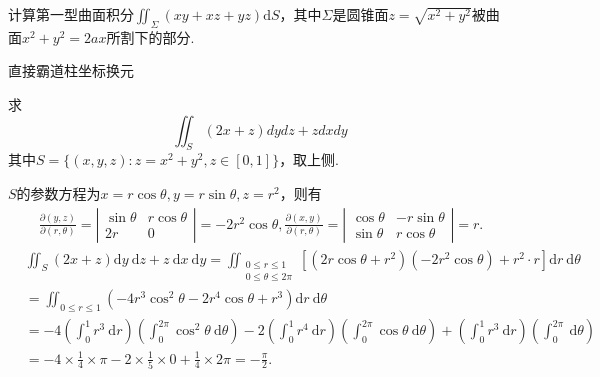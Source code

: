 \begin{exercise}
    计算第一型曲面积分$\iint_\Sigma(xy+xz+yz)\mathrm{d}S$，其中$\Sigma$是圆锥面$z=\sqrt{x^2+y^2}$被曲面$x^2+y^2=2ax$所割下的部分.
\end{exercise}
\begin{solution}
    直接霸道柱坐标换元
\end{solution}
\begin{exercise}
    求
    \[
        \iint_S(2x+z)dydz+zdxdy
    \]
    其中$S=\{(x,y,z):z=x^2+y^2,z\in[0,1]\}$，取上侧.
\end{exercise}
\begin{solution}
    $S$的参数方程为$x=r\cos\theta,y=r\sin\theta,z=r^2$，则有
    \[
    \begin{aligned}
    & \quad \frac{\partial(y, z)}{\partial(r, \theta)}=\left|\begin{array}{cc}
    \sin \theta & r \cos \theta \\
    2 r & 0
    \end{array}\right|=-2 r^2 \cos \theta, \frac{\partial(x, y)}{\partial(r, \theta)}=\left|\begin{array}{cc}
    \cos \theta & -r \sin \theta \\
    \sin \theta & r \cos \theta
    \end{array}\right|=r . \\
    & \iint_S(2 x+z) \mathrm{d} y \mathrm{~d} z+z \mathrm{~d} x \mathrm{~d} y=\iint_{\substack{0 \leq r \leq 1 \\
    0 \leq \theta \leq 2 \pi}}\left[\left(2 r \cos \theta+r^2\right)\left(-2 r^2 \cos \theta\right)+r^2 \cdot r\right] \mathrm{d} r \mathrm{~d} \theta \\
    & =\iint_{0 \leq r \leq 1}\left(-4 r^3 \cos ^2 \theta-2 r^4 \cos \theta+r^3\right) \mathrm{d} r \mathrm{~d} \theta \\
    & =-4\left(\int_0^1 r^3 \mathrm{~d} r\right)\left(\int_0^{2 \pi} \cos ^2 \theta \mathrm{~d} \theta\right)-2\left(\int_0^1 r^4 \mathrm{~d} r\right)\left(\int_0^{2 \pi} \cos \theta \mathrm{~d} \theta\right)+\left(\int_0^1 r^3 \mathrm{~d} r\right)\left(\int_0^{2 \pi} \mathrm{~d} \theta\right) \\
    & =-4 \times \frac{1}{4} \times \pi-2 \times \frac{1}{5} \times 0+\frac{1}{4} \times 2 \pi=-\frac{\pi}{2} .
    \end{aligned}
    \]
\end{solution}
